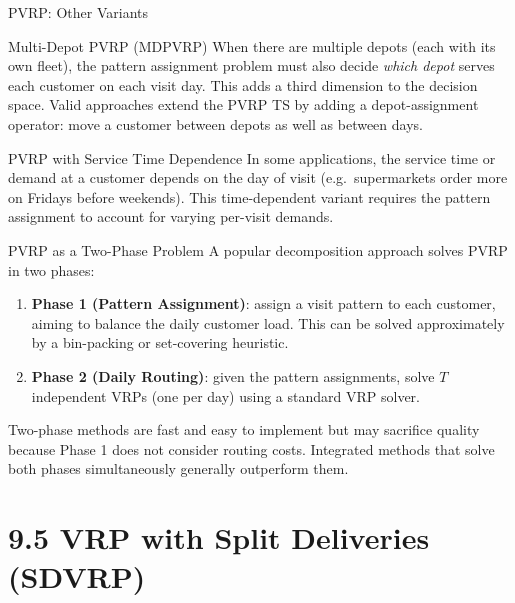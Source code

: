 \documentclass[aspectratio=169,10pt]{beamer}
\begin{document}
\begin{frame}[allowframebreaks]{PVRP: Other Variants}

\begin{block}{Multi-Depot PVRP (MDPVRP)}
  When there are multiple depots (each with its own fleet), the pattern
  assignment problem must also decide \emph{which depot} serves each customer
  on each visit day.  This adds a third dimension to the decision space.
  Valid approaches extend the PVRP TS by adding a depot-assignment operator:
  move a customer between depots as well as between days.
\end{block}

\begin{block}{PVRP with Service Time Dependence}
  In some applications, the service time or demand at a customer depends on
  the day of visit (e.g.\ supermarkets order more on Fridays before weekends).
  This time-dependent variant requires the pattern assignment to account for
  varying per-visit demands.
\end{block}

\begin{block}{PVRP as a Two-Phase Problem}
  A popular decomposition approach solves PVRP in two phases:
  \begin{enumerate}
    \item \textbf{Phase 1 (Pattern Assignment)}: assign a visit pattern to
          each customer, aiming to balance the daily customer load.  This
          can be solved approximately by a bin-packing or set-covering
          heuristic.
    \item \textbf{Phase 2 (Daily Routing)}: given the pattern assignments,
          solve $T$ independent VRPs (one per day) using a standard VRP
          solver.
  \end{enumerate}
  Two-phase methods are fast and easy to implement but may sacrifice quality
  because Phase 1 does not consider routing costs.  Integrated methods that
  solve both phases simultaneously generally outperform them.
\end{block}

\end{frame}

\section{9.5 VRP with Split Deliveries (SDVRP)}
\end{document}
